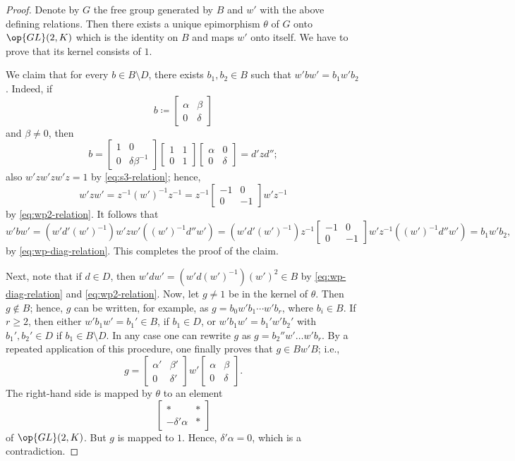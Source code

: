 \documentclass[../main.tex]{subfiles}
\begin{document}
\begin{proof}
	Denote by $G$ the free group generated by $B$ and $w'$ with the above defining relations. Then there exists a unique epimorphism $\theta$ of $G$ onto $\op{GL}(2,K)$ which is the identity on $B$ and maps $w'$ onto itself. We have to prove that its kernel consists of $1$.

	We claim that for every $b\in B\setminus D$, there exists $b_1,b_2\in B$ such that $w'bw'=b_1w'b_2$. Indeed, if
	\[b\coloneqq\begin{bmatrix}
		\alpha & \beta \\
		0 & \delta
	\end{bmatrix}\]
	and $\beta\ne0$, then
	\[b=\begin{bmatrix}
		1 & 0 \\
		0 & \delta\beta^{-1}
	\end{bmatrix}\begin{bmatrix}
		1 & 1 \\
		0 & 1
	\end{bmatrix}\begin{bmatrix}
		\alpha & 0 \\
		0 & \delta
	\end{bmatrix}=d'zd'';\]
	also $w'zw'zw'z=1$ by \eqref{eq:s3-relation}; hence,
	\[w'zw'=z^{-1}(w')^{-1}z^{-1}=z^{-1}\begin{bmatrix}
		-1 & 0\\
		0 & -1
	\end{bmatrix}w'z^{-1}\]
	by \eqref{eq:wp2-relation}. It follows that
	\[w'bw'=\left(w'd'(w')^{-1}\right)w'zw'\left((w')^{-1}d''w'\right)=\left(w'd'(w')^{-1}\right)z^{-1}\begin{bmatrix}
		-1 & 0 \\
		0 & -1
	\end{bmatrix}w'z^{-1}\left((w')^{-1}d''w'\right)=b_1w'b_2,\]
	by \eqref{eq:wp-diag-relation}. This completes the proof of the claim.

	Next, note that if $d\in D$, then $w'dw'=\left(w'd(w')^{-1}\right)(w')^2\in B$ by \eqref{eq:wp-diag-relation} and \eqref{eq:wp2-relation}. Now, let $g\ne1$ be in the kernel of $\theta$. Then $g\notin B$; hence, $g$ can be written, for example, as $g=b_0w'b_1\cdots w'b_r$, where $b_i\in B$. If $r\ge2$, then either $w'b_1w'=b_1'\in B$, if $b_1\in D$, or $w'b_1w'=b_1'w'b_2'$ with $b_1',b_2'\in D$ if $b_1\in B\setminus D$. In any case one can rewrite $g$ as $g=b_2''w'\ldots w'b_r$. By a repeated application of this procedure, one finally proves that $g\in Bw'B$; i.e.,
	\[g=\begin{bmatrix}
		\alpha' & \beta' \\
		0 & \delta'
	\end{bmatrix}w'\begin{bmatrix}
		\alpha & \beta \\
		0 & \delta
	\end{bmatrix}.\]
	The right-hand side is mapped by $\theta$ to an element
	\[\begin{bmatrix}
		* & * \\
		-\delta'\alpha & *
	\end{bmatrix}\]
	of $\op{GL}(2,K)$. But $g$ is mapped to $1$. Hence, $\delta'\alpha=0$, which is a contradiction.
\end{proof}
\end{document}

